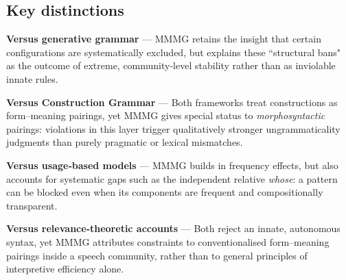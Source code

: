 \documentclass[12pt]{article}
\begin{document}
\subsection{Key distinctions}

\textbf{Versus generative grammar} —  
MMMG retains the insight that certain configurations are systematically excluded, but explains these ``structural bans" as the outcome of extreme, community‑level stability rather than as inviolable innate rules.

\textbf{Versus Construction Grammar} —  
Both frameworks treat constructions as form–meaning pairings, yet MMMG gives special status to \emph{morphosyntactic} pairings: violations in this layer trigger qualitatively stronger ungrammaticality judgments than purely pragmatic or lexical mismatches.

\textbf{Versus usage‑based models} —  
MMMG builds in frequency effects, but also accounts for systematic gaps such as the independent relative \textit{whose}: a pattern can be blocked even when its components are frequent and compositionally transparent.

\textbf{Versus relevance‑theoretic accounts} —  
Both reject an innate, autonomous syntax, yet MMMG attributes constraints to conventionalised form–meaning pairings inside a speech community, rather than to general principles of interpretive efficiency alone.



\end{document}
